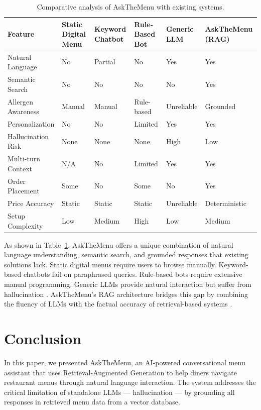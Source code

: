 \begin{table}[pos=h]
\caption{Comparative analysis of AskTheMenu with existing systems.}\label{tbl:comparative}
\begin{tabular*}{\textwidth}{@{}p{}p{}p{}p{}p{}p{}@{}}
\toprule
Feature & Static Digital Menu & Keyword Chatbot & Rule-Based Bot & Generic LLM & AskTheMenu (RAG) \\
\midrule
Natural Language & No & Partial & No & Yes & Yes \\
Semantic Search & No & No & No & No & Yes \\
Allergen Awareness & Manual & Manual & Rule-based & Unreliable & Grounded \\
Personalization & No & No & Limited & Yes & Yes \\
Hallucination Risk & None & None & None & High & Low \\
Multi-turn Context & N/A & No & Limited & Yes & Yes \\
Order Placement & Some & No & Some & No & Yes \\
Price Accuracy & Static & Static & Static & Unreliable & Deterministic \\
Setup Complexity & Low & Medium & High & Low & Medium \\
\bottomrule
\end{tabular*}
\end{table}

As shown in Table~\ref{tbl:comparative}, AskTheMenu offers a unique combination of natural language understanding, semantic search, and grounded responses that existing solutions lack. Static digital menus require users to browse manually. Keyword-based chatbots fail on paraphrased queries. Rule-based bots require extensive manual programming. Generic LLMs provide natural interaction but suffer from hallucination \cite{Huang2023Hallucination, Tonmoy2024Hallucination}. AskTheMenu's RAG architecture bridges this gap by combining the fluency of LLMs with the factual accuracy of retrieval-based systems \cite{Lewis2020RAG, Gao2024RAGSurvey}.


\section{Conclusion}\label{sec:conclusion}

In this paper, we presented AskTheMenu, an AI-powered conversational menu assistant that uses Retrieval-Augmented Generation to help diners navigate restaurant menus through natural language interaction. The system addresses the critical limitation of standalone LLMs --- hallucination --- by grounding all responses in retrieved menu data from a vector database.

